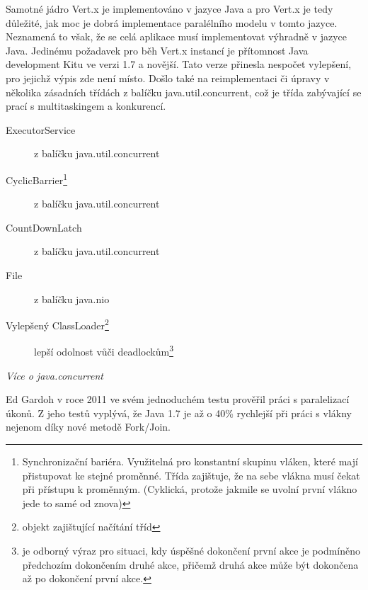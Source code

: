 Samotné jádro Vert.x je implementováno v jazyce Java a pro Vert.x je tedy důležité, jak moc je dobrá implementace paralélního modelu v tomto jazyce. Neznamená to však, že se celá aplikace musí implementovat výhradně v jazyce Java. Jedinému požadavek pro běh Vert.x instancí je přítomnost Java development Kitu ve verzi 1.7 a novější. Tato verze přinesla nespočet vylepšení, pro jejichž výpis zde není místo. Došlo také na reimplementaci či úpravy v několika zásadních třídách z balíčku java.util.concurrent, což je třída zabývající se prací s multitaskingem a konkurencí.
\begin{description}
\item[ExecutorService]{z balíčku java.util.concurrent}
\item[CyclicBarrier\footnote{Synchronizační bariéra. Využitelná pro konstantní skupinu vláken, které mají přistupovat ke stejné proměnné. Třída zajištuje, že na sebe vlákna musí čekat při přístupu k proměnným. (Cyklická, protože jakmile se uvolní první vlákno jede to samé od znova)}]{z balíčku java.util.concurrent}
\item[CountDownLatch]{z balíčku java.util.concurrent}
\item[File]{z balíčku java.nio}
\item[Vylepšený ClassLoader\footnote{objekt zajištující načítání tříd}]{lepší odolnost vůči deadlockům\footnote{ je odborný výraz pro situaci, kdy úspěšné dokončení první akce je podmíněno předchozím dokončením druhé akce, přičemž druhá akce může být dokončena až po dokončení první akce.}}
\end{description}
\emph{Více o java.concurrent\cite{javaChangelog}}

Ed Gardoh v roce 2011 ve svém jednoduchém testu\cite{serialTest} prověřil práci s paralelizací úkonů. Z jeho testů vyplývá, že Java 1.7 je až o 40\% rychlejší při práci s vlákny nejenom díky nové metodě Fork/Join\cite{forkJoin}.

